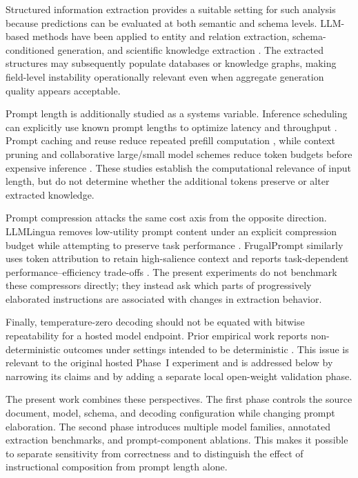 \documentclass[fleqn,10pt]{wlscirep-authoryear}
\begin{document}
Structured information extraction provides a suitable setting for such analysis
because predictions can be evaluated at both semantic and schema levels. LLM-based
methods have been applied to entity and relation extraction, schema-conditioned
generation, and scientific knowledge extraction
\cite{li2024structuredIE,dai2025kgllm,yang2025kbsSurvey}. The extracted structures
may subsequently populate databases or knowledge graphs, making field-level
instability operationally relevant even when aggregate generation quality appears
acceptable.

Prompt length is additionally studied as a systems variable. Inference scheduling
can explicitly use known prompt lengths to optimize latency and throughput
\cite{Bari2025}. Prompt caching and reuse reduce repeated prefill computation
\cite{Song2026,Pang20241238}, while context pruning and collaborative large/small
model schemes reduce token budgets before expensive inference
\cite{Li20251748,Soman2024}. These studies establish the computational relevance
of input length, but do not determine whether the additional tokens preserve or
alter extracted knowledge.

Prompt compression attacks the same cost axis from the opposite direction.
LLMLingua removes low-utility prompt content under an explicit compression budget
while attempting to preserve task performance \cite{jiang2023llmlingua}.
FrugalPrompt similarly uses token attribution to retain high-salience context and
reports task-dependent performance--efficiency trade-offs
\cite{raiyan2025frugalprompt}. The present experiments do not benchmark these
compressors directly; they instead ask which parts of progressively elaborated
instructions are associated with changes in extraction behavior.

Finally, temperature-zero decoding should not be equated with bitwise
repeatability for a hosted model endpoint. Prior empirical work reports
non-deterministic outcomes under settings intended to be deterministic
\cite{atil2025nondeterminism}. This issue is relevant to the original hosted
Phase~I experiment and is addressed below by narrowing its claims and by adding
a separate local open-weight validation phase.


The present work combines these perspectives. The first phase controls the source
document, model, schema, and decoding configuration while changing prompt
elaboration. The second phase introduces multiple model families, annotated
extraction benchmarks, and prompt-component ablations. This makes it possible to
separate sensitivity from correctness and to distinguish the effect of
instructional composition from prompt length alone.
\end{document}
